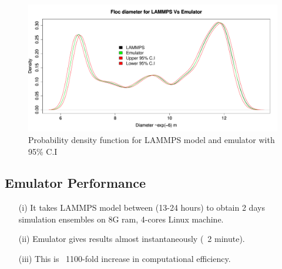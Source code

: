 \begin{figure}[!ht] 
\includegraphics[width=1.1\textwidth]{result2/pdf}
\caption[]{Probability density function for LAMMPS model and emulator with 95\% C.I}\label{diag2e}
\end{figure}

\subsection{Emulator Performance}
\begin{itemize}
\item[(i)] It takes LAMMPS model between (13-24 hours) to obtain 2 days simulation ensembles on  8G  ram,  4-cores  Linux  machine.
\item[(ii)] Emulator gives results almost instantaneously (~2 minute).  
\item[(iii)] This is ~1100-fold increase in computational efficiency.
\end{itemize}



